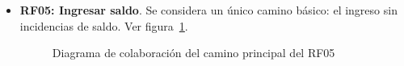 \begin{itemize}
	\FloatBarrier
	\item \textbf{RF05: Ingresar saldo}. Se considera un único camino básico: el ingreso sin incidencias de saldo. Ver figura~\ref{fig:diagramaColaboracion_RF05_1}.
	\begin{figure}[!htb]
		\centering
		\caption{Diagrama de colaboración del camino principal del RF05}
		\label{fig:diagramaColaboracion_RF05_1}
	\end{figure}
	

\end{itemize}
